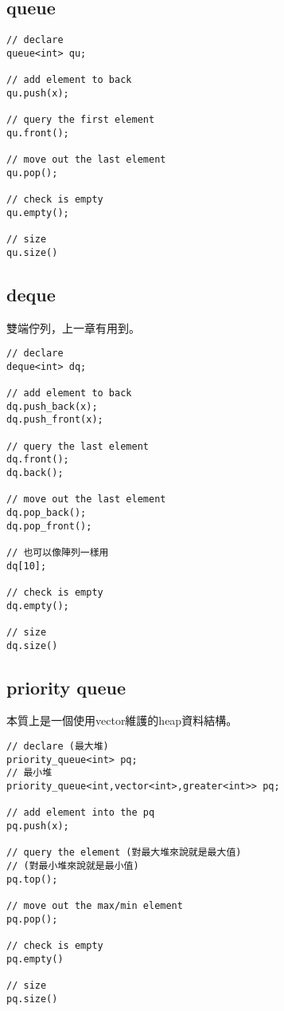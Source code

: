    \subsection{queue}

\begin{lstlisting}[caption=queue 用法]
// declare
queue<int> qu;

// add element to back
qu.push(x);

// query the first element
qu.front();

// move out the last element
qu.pop();

// check is empty
qu.empty();

// size
qu.size()
\end{lstlisting}

    \subsection{deque}

    雙端佇列，上一章有用到。

\begin{lstlisting}[caption=deque 用法]
// declare
deque<int> dq;

// add element to back
dq.push_back(x);
dq.push_front(x);

// query the last element
dq.front();
dq.back();

// move out the last element
dq.pop_back();
dq.pop_front();

// 也可以像陣列一樣用
dq[10];

// check is empty
dq.empty();

// size
dq.size()
\end{lstlisting}

    \subsection{priority queue}

    本質上是一個使用vector維護的heap資料結構。

\begin{lstlisting}[caption=priority queue 用法]
// declare (最大堆)
priority_queue<int> pq;
// 最小堆
priority_queue<int,vector<int>,greater<int>> pq;

// add element into the pq
pq.push(x);

// query the element (對最大堆來說就是最大值)
// (對最小堆來說就是最小值)
pq.top();

// move out the max/min element
pq.pop();

// check is empty
pq.empty()
    
// size
pq.size()
\end{lstlisting}

